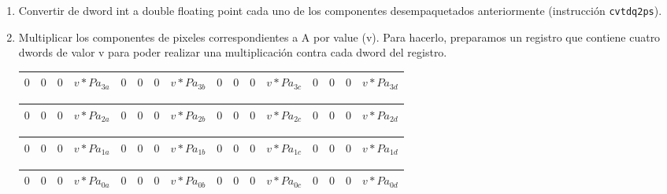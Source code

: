 \begin{enumerate}
\begin{tabular}{| g | g | g | g | g | g | g | g | g | g | g | g | g | g | g | g |}
\hline
$0$ & $0$ & $0$ & $Pb_{1a}$ & $0$ & $0$ & $0$ & $Pb_{1b}$ & $0$ & $0$ & $0$ & $Pb_{1c}$ & $0$ & $0$ & $0$ & $Pb_{1d}$\\ 
\hline
\end{tabular}

\begin{tabular}{| g | g | g | g | g | g | g | g | g | g | g | g | g | g | g | g |}
\hline
$0$ & $0$ & $0$ & $Pb_{0a}$ & $0$ & $0$ & $0$ & $Pb_{0b}$ & $0$ & $0$ & $0$ & $Pb_{0c}$ & $0$ & $0$ & $0$ & $Pb_{0d}$ \\ 
\hline
\end{tabular}

\item Convertir de dword int a double floating point cada uno de los componentes desempaquetados anteriormente (instrucción \texttt{cvtdq2ps}).
\item Multiplicar los componentes de pixeles correspondientes a A por value (v). Para hacerlo, preparamos un registro que contiene cuatro dwords de valor v para poder realizar una multiplicación contra cada dword del registro.

\begin{tabular}{| o | o | o | o | o | o | o | o | o | o | o | o | o | o | o | o |} %
\hline
$0$ & $0$ & $0$ & $v * Pa_{3a}$ & $0$ & $0$ & $0$ & $v * Pa_{3b}$ & $0$ & $0$ & $0$ & $v * Pa_{3c}$ & $0$ & $0$ & $0$ & $v * Pa_{3d}$ \\ 
\hline
\end{tabular}

\begin{tabular}{| o | o | o | o | o | o | o | o | o | o | o | o | o | o | o | o |} %
\hline
$0$ & $0$ & $0$ & $v * Pa_{2a}$ & $0$ & $0$ & $0$ & $v * Pa_{2b}$ & $0$ & $0$ & $0$ & $v * Pa_{2c}$ & $0$ & $0$ & $0$ & $v * Pa_{2d}$ \\ 
\hline
\end{tabular}

\begin{tabular}{| o | o | o | o | o | o | o | o | o | o | o | o | o | o | o | o |} %
\hline
$0$ & $0$ & $0$ & $v * Pa_{1a}$ & $0$ & $0$ & $0$ & $v * Pa_{1b}$ & $0$ & $0$ & $0$ & $v * Pa_{1c}$ & $0$ & $0$ & $0$ & $v * Pa_{1d}$\\ 
\hline
\end{tabular}

\begin{tabular}{| o | o | o | o | o | o | o | o | o | o | o | o | o | o | o | o |} %
\hline
$0$ & $0$ & $0$ & $v * Pa_{0a}$ & $0$ & $0$ & $0$ & $v * Pa_{0b}$ & $0$ & $0$ & $0$ & $v * Pa_{0c}$ & $0$ & $0$ & $0$ & $v * Pa_{0d}$ \\ 
\hline
\end{tabular}


\end{enumerate}
